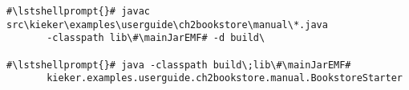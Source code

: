 \begin{lstlisting}[caption=Commands to compile and run the instrumented Bookstore under Windows,label=lst:bookstoreStarterWin]
#\lstshellprompt{}# javac src\kieker\examples\userguide\ch2bookstore\manual\*.java  
       -classpath lib\#\mainJarEMF# -d build\

#\lstshellprompt{}# java -classpath build\;lib\#\mainJarEMF#
       kieker.examples.userguide.ch2bookstore.manual.BookstoreStarter
\end{lstlisting}